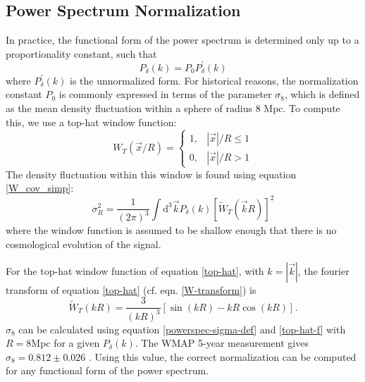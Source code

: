 \documentclass[12pt,preprint]{aastex}			%
\newcommand{\dd}{\mathrm{d}}
\begin{document}
\subsection{Power Spectrum Normalization}
In practice, the functional form of the power spectrum is determined only
up to a proportionality constant, such that
\begin{equation}
  P_\delta(k) = P_0 P^\prime_\delta(k)
\end{equation}
where $P^\prime_\delta(k)$ is the unnormalized form.
For historical reasons, the normalization constant $P_0$ is commonly 
expressed in terms of the parameter $\sigma_8$, 
which is defined as the mean density 
fluctuation within a sphere of radius 8 Mpc.  To compute this, we use a 
top-hat window function:
\begin{equation}
\label{top-hat}
  W_T(\vec{x}/R) = \left\{
    \begin{array}{ll}
      1, & |\vec x|/R \le 1 \\
      0, & |\vec x|/R > 1
    \end{array}
    \right.
\end{equation} 
The density fluctuation within this window is found using equation \ref{W_cov_simp}:
\begin{equation}
  \label{powerspec-sigma-def}
  \sigma_R^2 = \frac{1}{(2\pi)^3}\int \dd^3\vec{k} 
  P_\delta(k) [\widetilde{W}_T(\vec{k}R)]^2
\end{equation}
where the window function is assumed to be shallow enough that there is no
cosmological evolution of the signal.

For the top-hat window function of equation \ref{top-hat}, with 
$k = |\vec{k}|$,
the fourier transform of equation \ref{top-hat} (cf. eqn. \ref{W-transform}) is
\begin{equation}
  \label{top-hat-f}
  \widetilde{W}_T(kR) = \frac{3}{(kR)^3}\left[\sin(kR) - kR\cos(kR) \right].
\end{equation}
$\sigma_8$ can be calculated using equation \ref{powerspec-sigma-def}
and \ref{top-hat-f} with $R=8$Mpc for a given $P_\delta(k)$. 
The WMAP 5-year measurement gives $\sigma_8 = 0.812 \pm 0.026$ 
\citep{Hinshaw09}.  Using this value, the correct normalization 
can be computed for any functional form of the power spectrum.
\end{document}
